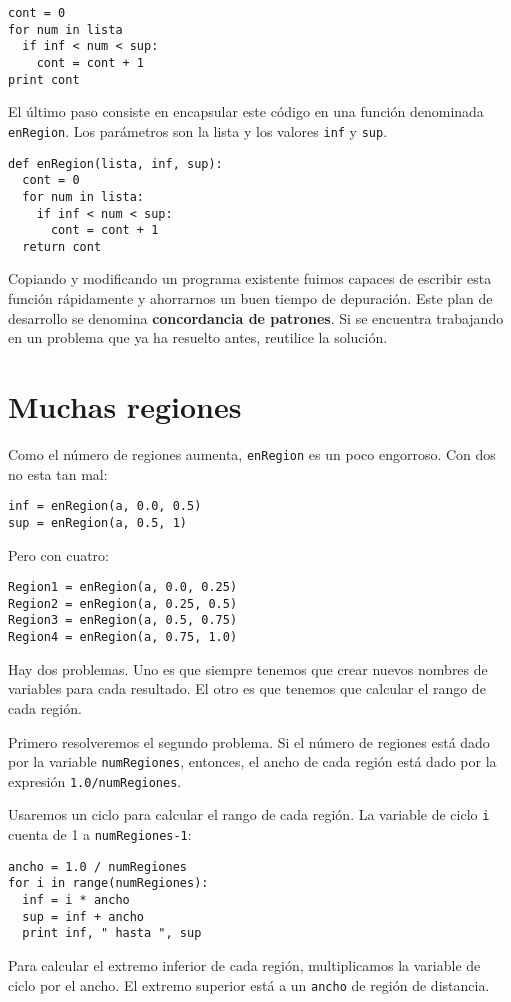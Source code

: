 \beforeverb
\begin{verbatim}
cont = 0
for num in lista
  if inf < num < sup:
    cont = cont + 1
print cont
\end{verbatim}
\afterverb
%
El último paso consiste en  encapsular este código en una
función denominada \texttt{enRegion}.  Los parámetros son la lista
y los valores \texttt{inf} y \texttt{sup}.

\beforeverb
\begin{verbatim}
def enRegion(lista, inf, sup):
  cont = 0
  for num in lista:
    if inf < num < sup:
      cont = cont + 1
  return cont
\end{verbatim}
\afterverb
%
Copiando y modificando un programa existente fuimos capaces
de escribir esta función rápidamente y ahorrarnos un buen
tiempo de depuración. Este plan de desarrollo se denomina
{\bf concordancia de patrones}. Si se encuentra trabajando 
en un problema que ya ha resuelto antes, reutilice la 
solución.

\section{Muchas regiones}
\label{muchasregiones}

Como el número de regiones aumenta, \texttt{enRegion} es 
un poco engorroso. Con dos no esta tan mal:

\beforeverb
\begin{verbatim}
inf = enRegion(a, 0.0, 0.5)
sup = enRegion(a, 0.5, 1)
\end{verbatim}
\afterverb
%
Pero con cuatro:

\beforeverb
\begin{verbatim}
Region1 = enRegion(a, 0.0, 0.25)
Region2 = enRegion(a, 0.25, 0.5)
Region3 = enRegion(a, 0.5, 0.75)
Region4 = enRegion(a, 0.75, 1.0)
\end{verbatim}
\afterverb
%
Hay dos problemas. Uno es que siempre tenemos que crear
nuevos nombres de variables para cada resultado. El otro
es que tenemos que calcular el rango de cada región.

Primero resolveremos el segundo problema. Si el número de
regiones está dado por la variable \texttt{numRegiones}, entonces, 
el ancho de cada región está dado por la expresión \texttt{1.0/numRegiones}.

Usaremos un ciclo para calcular el rango de cada región.
La variable de ciclo \texttt{i} cuenta de 1 a \texttt{numRegiones-1}:

\beforeverb
\begin{verbatim}
ancho = 1.0 / numRegiones
for i in range(numRegiones):
  inf = i * ancho
  sup = inf + ancho
  print inf, " hasta ", sup
\end{verbatim}
\afterverb
%
Para calcular el extremo inferior de cada región, multiplicamos
la variable de ciclo por el ancho. El extremo superior está
 a un  \texttt{ancho} de región de distancia.

